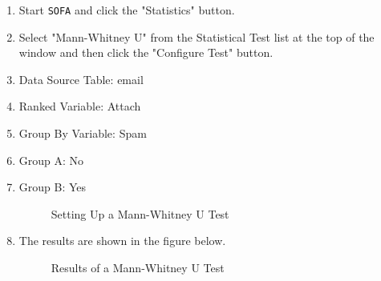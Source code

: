 \begin{enumerate}
  \item Start \texttt{SOFA} and click the "Statistics" button.
  \item Select "Mann-Whitney U" from the Statistical Test list at the top of the window and then click the "Configure Test" button.
  \item Data Source Table: email
  \item Ranked Variable: Attach
  \item Group By Variable: Spam
  \item Group A: No
  \item Group B: Yes
  
  \begin{figure}[H]
    \begin{center}
      \caption{Setting Up a Mann-Whitney U Test}
    \end{center}
  \end{figure}

  \item The results are shown in the figure below.

  \begin{figure}[H]
    \begin{center}
      \caption{Results of a Mann-Whitney U Test}
    \end{center}
  \end{figure}
    

\end{enumerate}
